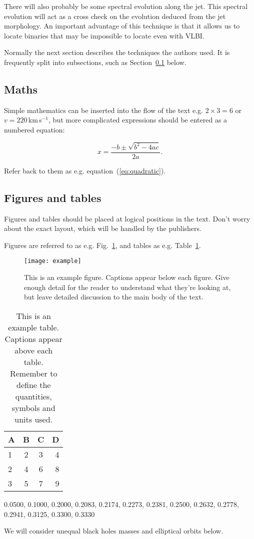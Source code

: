 There will also probably be some spectral evolution along the jet.
This spectral evolution will act as a cross check on the evolution
deduced from the jet morphology.  An important advantage of this
technique is that it allows us to locate binaries that may be
impossible to locate even with VLBI.


Normally the next section describes the techniques the authors used.
It is frequently split into subsections, such as Section~\ref{sec:maths} below.

\subsection{Maths}
\label{sec:maths} %

Simple mathematics can be inserted into the flow of the text e.g. $2\times3=6$
or $v=220$\,km\,s$^{-1}$, but more complicated expressions should be entered
as a numbered equation:

\begin{equation}
    x=\frac{-b\pm\sqrt{b^2-4ac}}{2a}.
	\label{eq:quadratic}
\end{equation}

Refer back to them as e.g. equation~(\ref{eq:quadratic}).

\subsection{Figures and tables}

Figures and tables should be placed at logical positions in the text. Don't
worry about the exact layout, which will be handled by the publishers.

Figures are referred to as e.g. Fig.~\ref{fig:example_figure}, and tables as
e.g. Table~\ref{tab:example_table}.

\begin{figure}
	\texttt{[image: example]}
    \caption{This is an example figure. Captions appear below each figure.
	Give enough detail for the reader to understand what they're looking at,
	but leave detailed discussion to the main body of the text.}
    \label{fig:example_figure}
\end{figure}

\begin{table}
	\centering
	\caption{This is an example table. Captions appear above each table.
	Remember to define the quantities, symbols and units used.}
	\label{tab:example_table}
	\begin{tabular}{lccr} %
		\hline
		A & B & C & D\\
		\hline
		1 & 2 & 3 & 4\\
		2 & 4 & 6 & 8\\
		3 & 5 & 7 & 9\\
		\hline
	\end{tabular}
\end{table}



 0.0500, 0.1000, 0.2000, 0.2083, 0.2174, 0.2273, 0.2381, 0.2500, 0.2632, 0.2778, 0.2941, 0.3125, 0.3300, 0.3330 


We will consider
unequal black holes masses and elliptical orbits below.  
